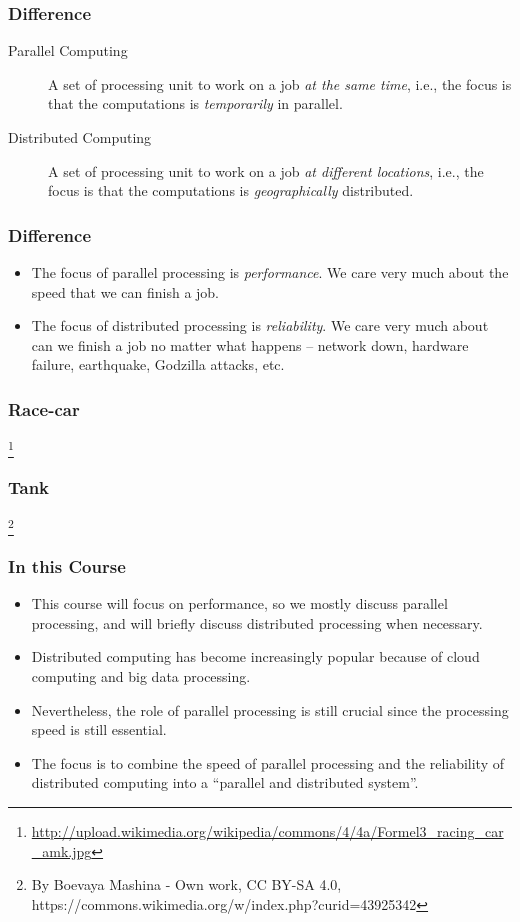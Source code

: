 \documentclass{beamer}
\begin{document}
\begin{CJK}{UTF8}{bsmi}
  \begin{frame}
    \frametitle{Difference}
    \begin{description}
    \item[Parallel Computing] A set of processing unit to work on a job
      {\em at the same time}, i.e., the focus is that the computations is
      {\em temporarily} in parallel.
    \item[Distributed Computing] A set of processing unit to work on a job
      {\em at different locations}, i.e., the focus is that the
      computations is {\em geographically} distributed.
    \end{description}
  \end{frame}

  \begin{frame}
    \frametitle{Difference}
    \begin{itemize}
    \item The focus of parallel processing is {\em performance}. 
      We care very much about the speed that we can finish a job.
    \item The focus of distributed processing is {\em reliability}. We care very much about can we finish a job no matter what happens -- network down, hardware failure, earthquake, Godzilla attacks, etc.
    \end{itemize}
  \end{frame}

  \begin{frame}
    \frametitle{Race-car}
    \centerline{}
    \footnote{\url{http://upload.wikimedia.org/wikipedia/commons/4/4a/Formel3_racing_car_amk.jpg}}
  \end{frame}

  \begin{frame}
    \frametitle{Tank}
    \centerline{}
    \footnote{
      By Boevaya Mashina - Own work, CC BY-SA 4.0, https://commons.wikimedia.org/w/index.php?curid=43925342
    }
  \end{frame}

  \begin{frame}
    \frametitle{In this Course}
    \begin{itemize}
    \item This course will focus on performance, so we mostly discuss
      parallel processing, and will briefly discuss distributed processing
      when necessary.
    \item Distributed computing has become increasingly popular because of
      cloud computing and big data processing.
    \item Nevertheless, the role of parallel processing is still crucial
      since the processing speed is still essential.
    \item The focus is to combine the speed of parallel processing and the
      reliability of distributed computing into a ``parallel and
      distributed system''.
    \end{itemize}
  \end{frame}


\end{CJK}
\end{document}
